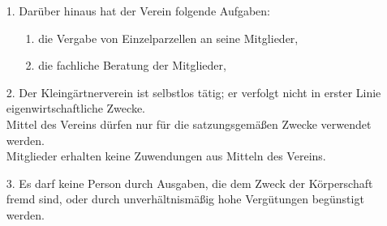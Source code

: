 \documentclass{scrartcl}
\begin{document}

\begin{itemize}
	\item[1.] Darüber hinaus hat der Verein folgende Aufgaben:
		\begin{itemize}
		 	\item[1.] die Vergabe von Einzelparzellen an seine Mitglieder,
		 	\item[2.] die fachliche Beratung der Mitglieder,
		 \end{itemize}
	\item[2.] Der Kleingärtnerverein ist selbstlos tätig; er verfolgt nicht in erster
	          Linie eigenwirtschaftliche Zwecke.\\
              Mittel des Vereins dürfen nur für die satzungsgemäßen Zwecke verwendet
              werden.\\
              Mitglieder erhalten keine Zuwendungen aus Mitteln des Vereins.
	\item[3.] Es darf keine Person durch Ausgaben, die dem Zweck der Körperschaft fremd
			  sind, oder durch unverhältnismäßig hohe Vergütungen begünstigt werden.
\end{itemize}


\end{document}
